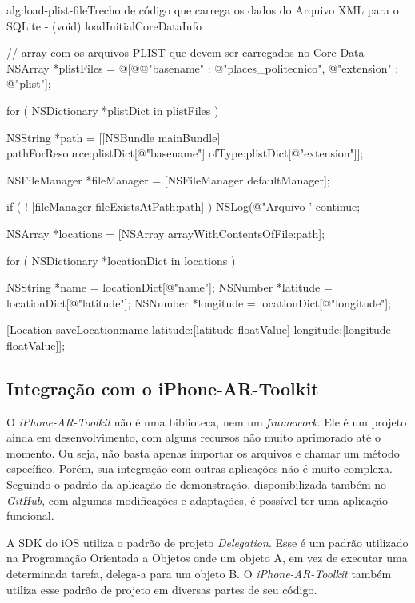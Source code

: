 \begin{sourcecode}{alg:load-plist-file}{Trecho de código que carrega os dados do Arquivo XML para o SQLite}
- (void) loadInitialCoreDataInfo
{
    // array com os arquivos PLIST que devem ser carregados no Core Data
    NSArray *plistFiles = @[@{@"basename" : @"places_politecnico", @"extension" : @"plist"}];

    for ( NSDictionary *plistDict in plistFiles )
    {
        NSString *path = [[NSBundle mainBundle] pathForResource:plistDict[@"basename"] ofType:plistDict[@"extension"]];

        NSFileManager *fileManager = [NSFileManager defaultManager];

        if ( ! [fileManager fileExistsAtPath:path] )
        {
            NSLog(@"Arquivo '%
            continue;
        }

        NSArray *locations = [NSArray arrayWithContentsOfFile:path];

        for ( NSDictionary *locationDict in locations )
        {
            NSString *name = locationDict[@"name"];
            NSNumber *latitude = locationDict[@"latitude"];
            NSNumber *longitude = locationDict[@"longitude"];

            [Location saveLocation:name latitude:[latitude floatValue] longitude:[longitude floatValue]];
        }
    }
}
\end{sourcecode}


\subsection{Integração com o iPhone-AR-Toolkit}

O \textit{iPhone-AR-Toolkit} não é uma biblioteca, nem um \textit{framework}. Ele é um
projeto ainda em desenvolvimento, com alguns recursos não muito aprimorado até o momento. Ou seja,
não basta apenas importar os arquivos e chamar um método específico. Porém, sua integração
com outras aplicações não é muito complexa. Seguindo o padrão da aplicação de demonstração, 
disponibilizada também no \textit{GitHub}, com algumas modificações e adaptações, é 
possível ter uma aplicação funcional.

A \gls{SDK} do iOS utiliza o padrão de projeto \textit{Delegation}. Esse é um padrão
utilizado na Programação Orientada a Objetos onde um objeto A, em vez de executar uma
determinada tarefa, delega-a para um objeto B. O \textit{iPhone-AR-Toolkit} também
utiliza esse padrão de projeto em diversas partes de seu código.


